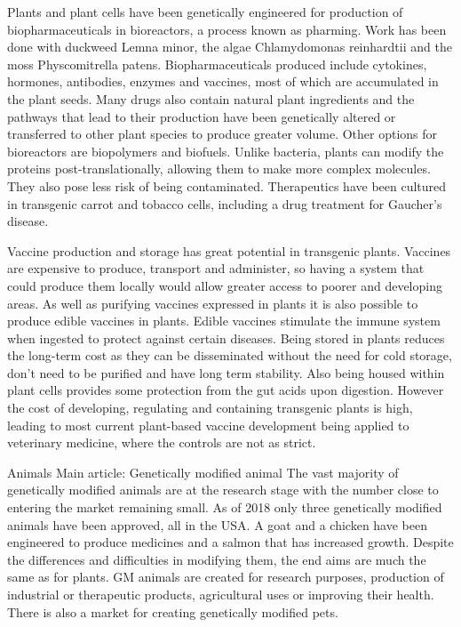 Plants and plant cells have been genetically engineered for production of biopharmaceuticals in bioreactors, a process known as pharming. Work has been done with duckweed Lemna minor, the algae Chlamydomonas reinhardtii and the moss Physcomitrella patens. Biopharmaceuticals produced include cytokines, hormones, antibodies, enzymes and vaccines, most of which are accumulated in the plant seeds. Many drugs also contain natural plant ingredients and the pathways that lead to their production have been genetically altered or transferred to other plant species to produce greater volume. Other options for bioreactors are biopolymers and biofuels. Unlike bacteria, plants can modify the proteins post-translationally, allowing them to make more complex molecules. They also pose less risk of being contaminated. Therapeutics have been cultured in transgenic carrot and tobacco cells, including a drug treatment for Gaucher's disease.

Vaccine production and storage has great potential in transgenic plants. Vaccines are expensive to produce, transport and administer, so having a system that could produce them locally would allow greater access to poorer and developing areas. As well as purifying vaccines expressed in plants it is also possible to produce edible vaccines in plants. Edible vaccines stimulate the immune system when ingested to protect against certain diseases. Being stored in plants reduces the long-term cost as they can be disseminated without the need for cold storage, don't need to be purified and have long term stability. Also being housed within plant cells provides some protection from the gut acids upon digestion. However the cost of developing, regulating and containing transgenic plants is high, leading to most current plant-based vaccine development being applied to veterinary medicine, where the controls are not as strict.

Animals
Main article: Genetically modified animal
The vast majority of genetically modified animals are at the research stage with the number close to entering the market remaining small. As of 2018 only three genetically modified animals have been approved, all in the USA. A goat and a chicken have been engineered to produce medicines and a salmon that has increased growth. Despite the differences and difficulties in modifying them, the end aims are much the same as for plants. GM animals are created for research purposes, production of industrial or therapeutic products, agricultural uses or improving their health. There is also a market for creating genetically modified pets.

